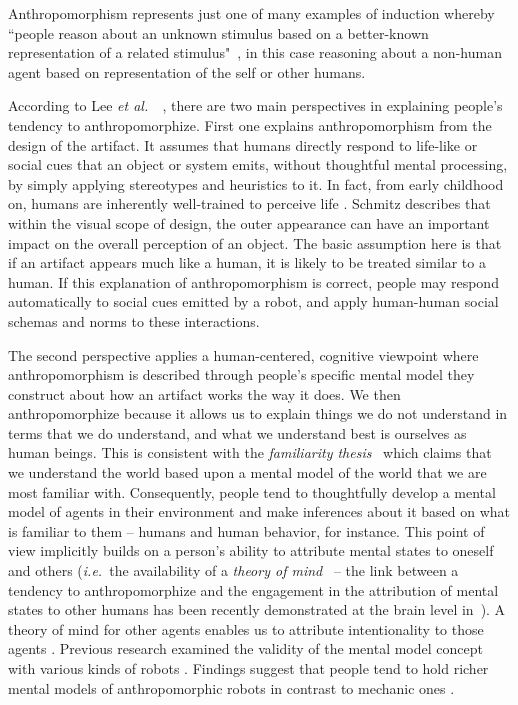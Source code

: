 \documentclass{frontiersSCNS} %
\newcommand{\etal}{{\textit{et al.~}}}
\newcommand{\ie}{{\textit{i.e.~}}}
\begin{document}

Anthropomorphism represents just one of many examples of induction whereby
``people reason about an unknown stimulus based on a better-known representation
of a related stimulus"~\cite{epley_when_2008}, in this case reasoning about a
non-human agent based on representation of the self or other humans.

According to Lee \etal~\cite{lee_human_2005}, there are two main perspectives in
explaining people's tendency to anthropomorphize. First one explains
anthropomorphism from the design of the artifact. It assumes that humans
directly respond to life-like or social cues that an object or system emits,
without thoughtful mental processing, by simply applying stereotypes and
heuristics to it. In fact, from early childhood on, humans are inherently
well-trained to perceive life \cite{epley_seeing_2007}. Schmitz
\cite{schmitz_concepts_2011} describes that within the visual scope of design,
the outer appearance can have an important impact on the overall perception of
an object. The basic assumption here is that if an artifact appears much like a
human, it is likely to be treated similar to a human. If this explanation of
anthropomorphism is correct, people may respond automatically to social cues
emitted by a robot, and apply human-human social schemas and norms to these
interactions.

The second perspective applies a human-centered, cognitive viewpoint where
anthropomorphism is described through people's specific mental model they
construct about how an artifact works the way it does.  We then
anthropomorphize because it allows us to explain things we do not understand in
terms that we do understand, and what we understand best is ourselves as human
beings. This is consistent with the \emph{familiarity
thesis}~\cite{hegel_understanding_2008} which claims that we understand the
world based upon a mental model of the world that we are most familiar with.
Consequently, people tend to thoughtfully develop a mental model of agents in
their environment and make inferences about it based on what is familiar to
them -- humans and human behavior, for instance.  This point of view implicitly
builds on a person's ability to attribute mental states to oneself and others
(\ie the availability of a \emph{theory of mind}~\cite{premack1978does} -- the
link between a tendency to anthropomorphize and the engagement in the
attribution of mental states to other humans has been recently demonstrated at
the brain level in~\cite{cullen2013individual}). A theory of mind for other
agents enables us to attribute intentionality to those agents
\cite{leslie_pretense_1987,admoni_multi-category_2012}. Previous research
examined the validity of the mental model concept with various kinds of robots
\cite{schmitz_concepts_2011,kiesler_mental_2002}. Findings suggest that people
tend to hold richer mental models of anthropomorphic robots in contrast to
mechanic ones \cite{kiesler_mental_2002}.
\end{document}
